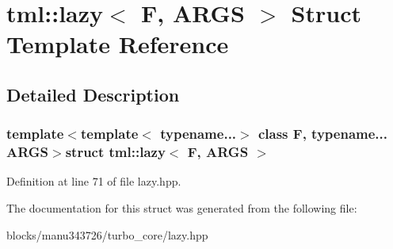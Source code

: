 \hypertarget{structtml_1_1lazy}{\section{tml\+:\+:lazy$<$ F, A\+R\+G\+S $>$ Struct Template Reference}
\label{structtml_1_1lazy}
}


\subsection{Detailed Description}
\subsubsection*{template$<$template$<$ typename...$>$ class F, typename... A\+R\+G\+S$>$struct tml\+::lazy$<$ F, A\+R\+G\+S $>$}



Definition at line 71 of file lazy.\+hpp.



The documentation for this struct was generated from the following file\+:\begin{DoxyCompactItemize}
\item 
blocks/manu343726/turbo\+\_\+core/lazy.\+hpp\end{DoxyCompactItemize}
